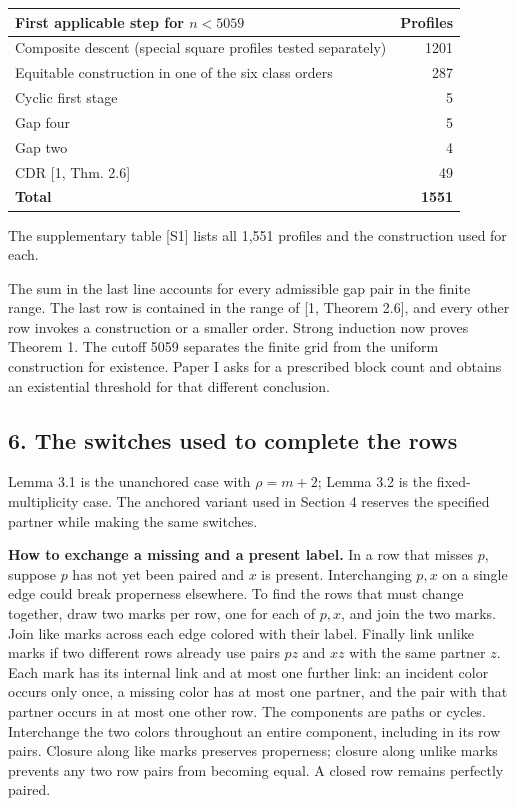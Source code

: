 \documentclass[english,11pt,a4paper]{article}
\begin{document}
{\begin{longtable}[]{@{}lr@{}}
\toprule\noalign{}
First applicable step for \(n<5059\) & Profiles \\
\midrule\noalign{}
\endhead
\bottomrule\noalign{}
\endlastfoot
Composite descent (special square profiles tested separately) & 1201 \\
Equitable construction in one of the six class orders & 287 \\
Cyclic first stage & 5 \\
Gap four & 5 \\
Gap two & 4 \\
CDR {[}1, Thm. 2.6{]} & 49 \\
\textbf{Total} & \textbf{1551} \\
\end{longtable}
}

The supplementary table {[}S1{]} lists all 1,551 profiles and the construction used for each.

The sum in the last line accounts for every admissible gap pair in the finite range. The last row is contained in the range of {[}1, Theorem 2.6{]}, and every other row invokes a construction or a smaller order. Strong induction now proves Theorem 1. The cutoff 5059 separates the finite grid from the uniform construction for existence. Paper I asks for a prescribed block count and obtains an existential threshold for that different conclusion.

\subsection{6. The switches used to complete the rows}\label{the-switches-used-to-complete-the-rows}

Lemma 3.1 is the unanchored case with \(\rho=m+2\); Lemma 3.2 is the fixed-multiplicity case. The anchored variant used in Section 4 reserves the specified partner while making the same switches.

\textbf{How to exchange a missing and a present label.} In a row that misses \(p\), suppose \(p\) has not yet been paired and \(x\) is present. Interchanging \(p,x\) on a single edge could break properness elsewhere. To find the rows that must change together, draw two marks per row, one for each of \(p,x\), and join the two marks. Join like marks across each edge colored with their label. Finally link unlike marks if two different rows already use pairs \(pz\) and \(xz\) with the same partner \(z\). Each mark has its internal link and at most one further link: an incident color occurs only once, a missing color has at most one partner, and the pair with that partner occurs in at most one other row. The components are paths or cycles. Interchange the two colors throughout an entire component, including in its row pairs. Closure along like marks preserves properness; closure along unlike marks prevents any two row pairs from becoming equal. A closed row remains perfectly paired.
\end{document}
